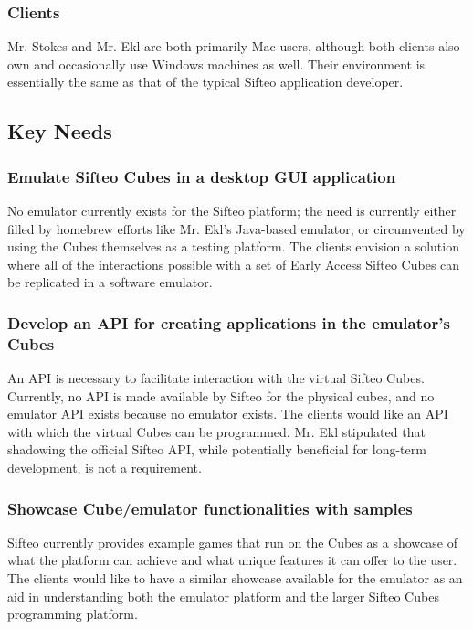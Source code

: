 \documentclass[12pt]{article}
\begin{document}
                          \subsubsection{Clients}
			  Mr. Stokes and Mr. Ekl are both primarily \gls{Mac} users, although both clients also own and occasionally use \gls{Windows} machines as well. Their environment is essentially the same as that of the typical Sifteo application developer.

               \subsection{Key Needs}

                          \subsubsection{Emulate Sifteo Cubes in a desktop GUI application}
                          No emulator currently exists for the Sifteo platform; the need is currently either filled by homebrew efforts like Mr. Ekl's Java-based emulator, or circumvented by using the Cubes themselves as a testing platform. The clients envision a solution where all of the interactions possible with a set of Early Access Sifteo Cubes can be replicated in a software emulator.

                          \subsubsection{Develop an API for creating applications in the emulator’s Cubes}
                          An \gls{API} is necessary to facilitate interaction with the virtual Sifteo Cubes. Currently, no \gls{API} is made available by Sifteo for the physical cubes, and no emulator \gls{API} exists because no emulator exists. The clients would like an \gls{API} with which the virtual Cubes can be programmed. Mr. Ekl stipulated that shadowing the official Sifteo \gls{API}, while potentially beneficial for long-term development, is not a requirement.

                          \subsubsection{Showcase Cube/emulator functionalities with samples}
                          Sifteo currently provides example games that run on the Cubes as a showcase of what the platform can achieve and what unique features it can offer to the user. The clients would like to have a similar showcase available for the emulator as an aid in understanding both the emulator platform and the larger Sifteo Cubes programming platform.
\end{document}
